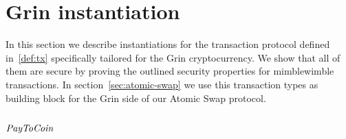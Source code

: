 \section{Grin instantiation}\label{sec:atomic-inst}

In this section we describe instantiations for the transaction protocol defined in~\ref{def:tx} specifically tailored for the Grin cryptocurrency. We show that all of them are secure by proving the
outlined security properties for mimblewimble transactions. In section~\ref{sec:atomic-swap} we use this transaction types as building block for the Grin side of our Atomic Swap protocol.

\subsection{$\mathit{PayToCoin}$}

